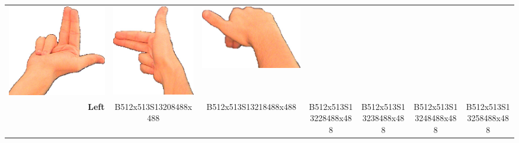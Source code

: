 \documentclass{article}
\begin{document}
\begin{center}
\begin{tabular}{r*{6}{c}}
\includegraphics[scale=0.1]{images/03-08-4.jpg}&
\includegraphics[scale=0.1]{images/03-08-5.jpg}&
\includegraphics[scale=0.1]{images/03-08-6.jpg}\\
\textbf{Left}&
B512x513S13208488x488&
B512x513S13218488x488&
B512x513S13228488x488&
B512x513S13238488x488&
B512x513S13248488x488&
B512x513S13258488x488\\
\end{tabular}
\end{center}
\end{document}
